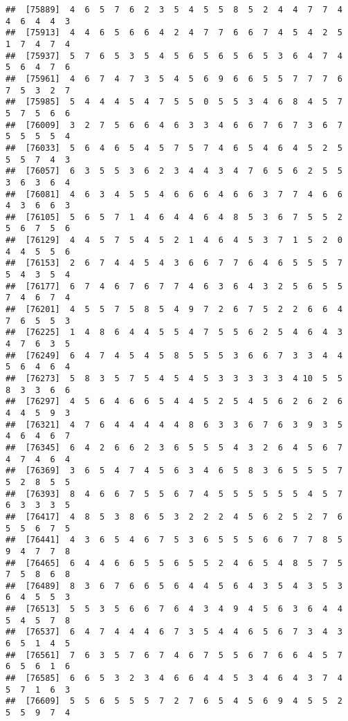 \documentclass[
]{book}
\begin{document}
\begin{verbatim}
##  [75889]  4  6  5  7  6  2  3  5  4  5  5  8  5  2  4  4  7  7  4  4  6  4  4  3
##  [75913]  4  4  6  5  6  6  4  2  4  7  7  6  6  7  4  5  4  2  5  1  7  4  7  4
##  [75937]  5  7  6  5  3  5  4  5  6  5  6  5  6  5  3  6  4  7  4  5  6  4  7  6
##  [75961]  4  6  7  4  7  3  5  4  5  6  9  6  6  5  5  7  7  7  6  7  5  3  2  7
##  [75985]  5  4  4  4  5  4  7  5  5  0  5  5  3  4  6  8  4  5  7  5  7  5  6  6
##  [76009]  3  2  7  5  6  6  4  6  3  3  4  6  6  7  6  7  3  6  7  5  5  5  5  4
##  [76033]  5  6  4  6  5  4  5  7  5  7  4  6  5  4  6  4  5  2  5  5  5  7  4  3
##  [76057]  6  3  5  5  3  6  2  3  4  4  3  4  7  6  5  6  2  5  5  3  6  3  6  4
##  [76081]  4  6  3  4  5  5  4  6  6  6  4  6  6  3  7  7  4  6  6  4  3  6  6  3
##  [76105]  5  6  5  7  1  4  6  4  4  6  4  8  5  3  6  7  5  5  2  5  6  7  5  6
##  [76129]  4  4  5  7  5  4  5  2  1  4  6  4  5  3  7  1  5  2  0  4  4  5  5  6
##  [76153]  2  6  7  4  4  5  4  3  6  6  7  7  6  4  6  5  5  5  7  5  4  3  5  4
##  [76177]  6  7  4  6  7  6  7  7  4  6  3  6  4  3  2  5  6  5  5  7  4  6  7  4
##  [76201]  4  5  5  7  5  8  5  4  9  7  2  6  7  5  2  2  6  6  4  7  6  5  5  3
##  [76225]  1  4  8  6  4  4  5  5  4  7  5  5  6  2  5  4  6  4  3  4  7  6  3  5
##  [76249]  6  4  7  4  5  4  5  8  5  5  5  3  6  6  7  3  3  4  4  5  6  4  6  4
##  [76273]  5  8  3  5  7  5  4  5  4  5  3  3  3  3  3  4 10  5  5  8  3  3  6  6
##  [76297]  4  5  6  4  6  6  5  4  4  5  2  5  4  5  6  2  6  2  6  4  4  5  9  3
##  [76321]  4  7  6  4  4  4  4  4  8  6  3  3  6  7  6  3  9  3  5  4  6  4  6  7
##  [76345]  6  4  2  6  6  2  3  6  5  5  5  4  3  2  6  4  5  6  7  4  7  4  6  4
##  [76369]  3  6  5  4  7  4  5  6  3  4  6  5  8  3  6  5  5  5  7  5  2  8  5  5
##  [76393]  8  4  6  6  7  5  5  6  7  4  5  5  5  5  5  5  4  5  7  6  3  3  3  5
##  [76417]  4  8  5  3  8  6  5  3  2  2  2  4  5  6  2  5  2  7  6  5  5  6  7  5
##  [76441]  4  3  6  5  4  6  7  5  3  6  5  5  5  6  6  7  7  8  5  9  4  7  7  8
##  [76465]  6  4  4  6  6  5  5  6  5  5  2  4  6  5  4  8  5  7  5  7  5  8  6  8
##  [76489]  8  3  6  7  6  6  5  6  4  4  5  6  4  3  5  4  3  5  3  6  4  5  5  3
##  [76513]  5  5  3  5  6  6  7  6  4  3  4  9  4  5  6  3  6  4  4  5  4  5  7  8
##  [76537]  6  4  7  4  4  4  6  7  3  5  4  4  6  5  6  7  3  4  3  6  5  1  4  5
##  [76561]  7  6  3  5  7  6  7  4  6  7  5  5  6  7  6  6  4  5  7  6  5  6  1  6
##  [76585]  6  6  5  3  2  3  4  6  6  4  4  5  3  4  6  4  3  7  4  5  7  1  6  3
##  [76609]  5  5  6  5  5  5  7  2  7  6  5  4  5  6  9  4  5  5  2  5  5  9  7  4

\end{verbatim}
\end{document}
